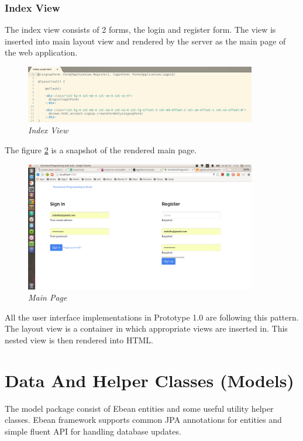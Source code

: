 \documentclass[12pt,twoside,a4paper]{report}
\begin{document}
\subsubsection{Index View}\label{4.3.1.2}
The index view consists of 2 forms, the login and register form. The view is inserted into main layout view and rendered by the server as the main page of the web application.

\begin{figure}[!ht]
	\centering
		\includegraphics[width=0.9\textwidth, totalheight=4cm]
		{index_view}
	\caption{\textit{Index View}}
	\label{f4.3.1.2}
\end{figure}

The figure \ref{f4.3.1.3} is a snapshot of the rendered main page.

\begin{figure}[!ht]
	\centering
		\includegraphics[width=0.9\textwidth, totalheight=8cm]
		{main_page_view}
	\caption{\textit{Main Page}}
	\label{f4.3.1.3}
\end{figure}

All the user interface implementations in Prototype 1.0 are following this pattern. The layout view is a container in which appropriate views are inserted in. This nested view is then rendered into HTML.

\section{Data And Helper Classes (Models)}\label{4.4}
The model package consist of Ebean entities and some useful utility helper classes. Ebean framework supports common JPA annotations for entities and simple fluent API for handling database updates.
\end{document}
